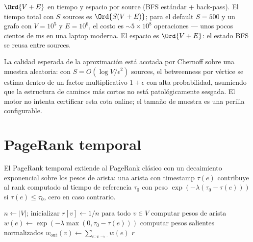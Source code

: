 \begin{complexity}
$\Ord{V + E}$ en tiempo y espacio por source (BFS estándar +
back-pass). El tiempo total con $S$ sources es $\Ord{S (V + E)}$;
para el default $S = 500$ y un grafo con $V = 10^5$ y $E = 10^6$,
el costo es $\sim 5 \times 10^8$ operaciones --- unos pocos
cientos de ms en una laptop moderna. El espacio es $\Ord{V + E}$:
el estado BFS se reusa entre sources.
\end{complexity}

La calidad esperada de la aproximación está acotada por
Chernoff sobre una muestra aleatoria: con $S = O(\log V /
\epsilon^2)$ sources, el betweenness por vértice se estima
dentro de un factor multiplicativo $1 \pm \epsilon$ con alta
probabilidad, asumiendo que la estructura de caminos más cortos
no está patológicamente sesgada. El motor no intenta certificar
esta cota online; el tamaño de muestra es una perilla
configurable.

\section{PageRank temporal}

El PageRank temporal extiende al PageRank clásico con un
decaimiento exponencial sobre los pesos de arista: una arista
con timestamp $\tau(e)$ contribuye al rank computado al tiempo
de referencia $\tau_0$ con peso
$\exp(-\lambda (\tau_0 - \tau(e)))$ si $\tau(e) \leq \tau_0$,
cero en caso contrario.

\begin{algorithm}
\caption{\textsc{Compute-Temporal-PageRank}}\label{alg:temporal-pr}
$n \gets |V|$; inicializar $r[v] \gets 1/n$ para todo $v \in V$\;
computar pesos de arista $w(e) \gets \exp(-\lambda \max(0, \tau_0 - \tau(e)))$\;
computar pesos salientes normalizados $w_{\text{out}}(v) \gets \sum_{e: v \to \cdot} w(e)$\;
\Return $r$\;
\end{algorithm}

